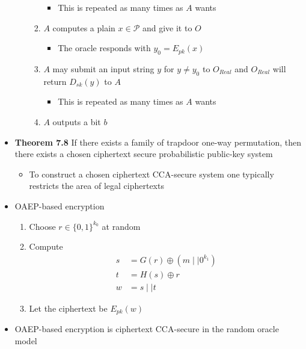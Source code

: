 \begin{itemize}
\begin{itemize}
\begin{enumerate}
      \begin{itemize}
  			\item This is repeated as many times as $A$ wants
      \end{itemize}
  		\item $A$ computes a plain $x \in \mathcal P$ and give it to $O$
      \begin{itemize}
  			\item The oracle responds with $y_0 = E_{pk}(x)$
      \end{itemize}
  		\item $A$ may submit an input string $y$ for $y \neq y_0$ to $O_{Real}$ and $O_{Real}$ will return $D_{sk}(y)$ to $A$
      \begin{itemize}
  			\item This is repeated as many times as $A$ wants
      \end{itemize}
  		\item $A$ outputs a bit $b$
    \end{enumerate}
  \end{itemize}
  \item \textbf{Theorem 7.8} If there exists a family of trapdoor one-way permutation, then there exists a chosen ciphertext secure probabilistic public-key system
  \begin{itemize}
    \item To construct a chosen ciphertext CCA-secure system one typically restricts the area of legal ciphertexts	
  \end{itemize}
  \item OAEP-based encryption 
  \begin{enumerate}
  	\item Choose $r \in \{0,1\}^{k_0}$ at random
    \item Compute 
    \begin{align*}
      s &= G(r) \oplus (m \mid \mid 0^{k_1}) \\
      t &= H(s) \oplus r \\
      w &= s \mid \mid t
    \end{align*}
    \item Let the ciphertext be $E_{pk}(w)$ 
  \end{enumerate} 
  \item OAEP-based encryption is ciphertext CCA-secure in the random oracle model	
\end{itemize}

\newpage

